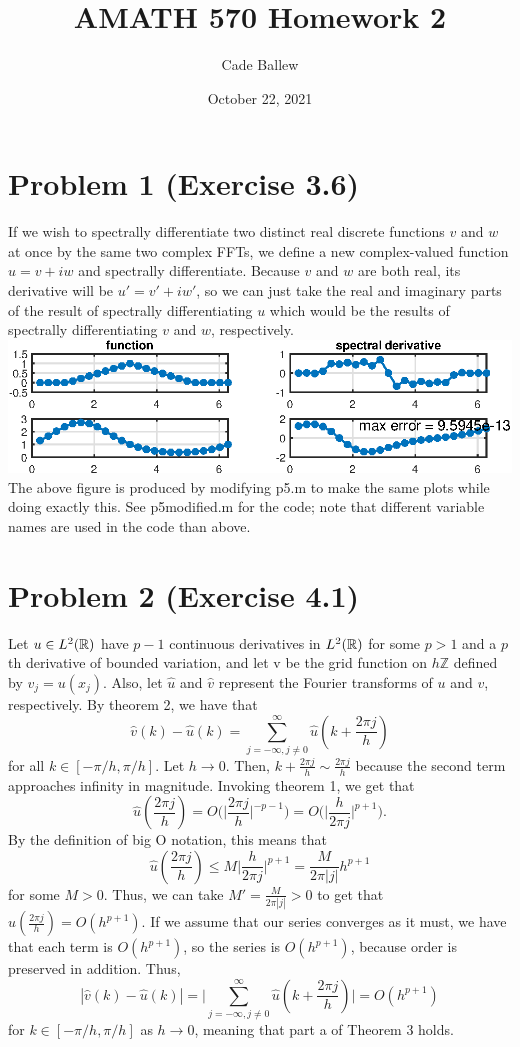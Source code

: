 \documentclass{article}
\title{AMATH 570 Homework 2}
\author{Cade Ballew}
\date{October 22, 2021}
\begin{document}
\maketitle

\section{Problem 1 (Exercise 3.6)}
If we wish to spectrally differentiate two distinct real discrete functions $v$ and $w$ at once by the same two
complex FFTs, we define a new complex-valued function $u=v+iw$ and spectrally differentiate. Because $v$ and $w$ are both real, its derivative will be $u'=v'+iw'$, so we can just take the real and imaginary parts of the result of spectrally differentiating $u$ which would be the results of spectrally differentiating $v$ and $w$, respectively.\\
\includegraphics[]{prob3-6.eps}
\\The above figure is produced by modifying p5.m to make the same plots while doing exactly this. See p5modified.m for the code; note that different variable names are used in the code than above. 

\section{Problem 2 (Exercise 4.1)} 
Let $u\in L^2(\mathbb{R})$ have $p-1$ continuous derivatives in $L^2(\mathbb{R})$ for some $p>1$ and a $p$th derivative of bounded variation, and let v be the grid function on $h\mathbb{Z}$ defined by $v_j=u(x_j)$. Also, let $\hat{u}$ and $\hat{v}$ represent the Fourier transforms of $u$ and $v$, respectively. By theorem 2, we have that \[
\hat{v}(k)-\hat{u}(k)=\sum_{j=-\infty,j\neq0}^\infty\hat{u}(k+\frac{2\pi j}{h})
\]
for all $k\in[-\pi/h,\pi/h]$. Let $h\to0$. Then, $k+\frac{2\pi j}{h}\sim\frac{2\pi j}{h}$ because the second term approaches infinity in magnitude. Invoking theorem 1, we get that 
\[
\hat{u}(\frac{2\pi j}{h})=O\bigg(\bigg|\frac{2\pi j}{h}\bigg|^{-p-1}\bigg)=O\bigg(\bigg|\frac{h}{2\pi j}\bigg|^{p+1}\bigg).
\]
By the definition of big O notation, this means that \[
\hat{u}(\frac{2\pi j}{h})\leq M\bigg|\frac{h}{2\pi j}\bigg|^{p+1}=\frac{M}{2\pi |j|}h^{p+1}
\]
for some $M>0$. Thus, we can take $M'=\frac{M}{2\pi |j|}>0$ to get that $\hat{u}(\frac{2\pi j}{h})=O(h^{p+1})$. If we assume that our series converges as it must, we have that each term is $O(h^{p+1})$, so the series is $O(h^{p+1})$, because order is preserved in addition. Thus, 
\[
|\hat{v}(k)-\hat{u}(k)|=\bigg|\sum_{j=-\infty,j\neq0}^\infty\hat{u}(k+\frac{2\pi j}{h})\bigg|=O(h^{p+1})
\]
for $k\in[-\pi/h,\pi/h]$ as $h\to0$, meaning that part a of Theorem 3 holds. 
\end{document}
